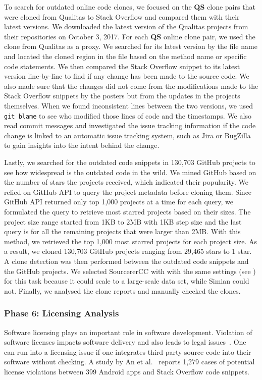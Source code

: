 \documentclass[10pt,journal,compsoc]{IEEEtran}
\begin{document}
To search for outdated online code clones, we focused on the \textbf{QS} clone
pairs that were cloned from Qualitas to Stack Overflow and compared them with
their latest versions. We downloaded the latest version of the Qualitas projects
from their repositories on October 3, 2017. For each \textbf{QS} online clone
pair, we used the clone from Qualitas as a proxy. We searched for its latest
version by the file name and located the cloned region in the file based on the
method name or specific code statements. We then compared the Stack Overflow
snippet to its latest version line-by-line to find if any change has been made
to the source code. We also made sure that the changes did not come from the
modifications made to the Stack Overflow snippets by the posters but from the
updates in the projects themselves. When we found inconsistent lines between the
two versions, we used {\small\texttt{git blame}} to see who modified those lines
of code and the timestamps. We also read commit messages and investigated the issue tracking information
if the code change is linked to an automatic issue tracking system, such as Jira
or BugZilla to gain insights into the intent behind the change.

Lastly, we searched for the outdated code snippets in 130,703 GitHub projects to
see how widespread is the outdated code in the wild. We mined GitHub
based on the number of stars the projects received, which indicated their popularity. We relied on
GitHub API to query the project metadata before cloning them.
Since GitHub API returned only top 1,000 projects at a time for each query, we formulated the
query to retrieve most starred projects based on their sizes.
The project size range started from 1KB to 2MB with 1KB step size and the last query is
for all the remaining projects that were larger than 2MB.
With this method, we retrieved the top 1,000 most starred projects for each project size. 
As a result, we cloned 130,703 GitHub projects ranging from 29,465 stars to 1 star.
A clone detection was then performed between the outdated code snippets and the GitHub
projects. We selected SourcererCC with with the same settings (see ) 
for this task because it could scale to a large-scale data set, while Simian could not. Finally, we analysed
the clone reports and manually checked the clones.

\subsubsection{Phase 6: Licensing Analysis} Software licensing plays an important
role in software development. Violation of software licenses impacts software
delivery and also leads to legal issues~\cite{Sprigman2015}. 
One can run into a licensing issue if one integrates third-party source code
into their software without checking. A study by An et al.~\cite{An2017} reports
1,279 cases of potential license violations between 399 Android apps and Stack
Overflow code snippets.
\end{document}
